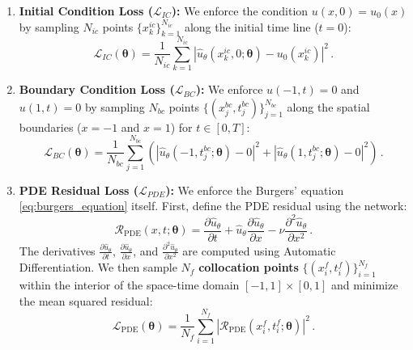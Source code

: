 \begin{enumerate}
    \item \textbf{Initial Condition Loss ($\mathcal{L}_{IC}$):} We enforce the condition $u(x, 0) = u_0(x)$ by sampling $N_{ic}$ points $\{x_k^{ic}\}_{k=1}^{N_{ic}}$ along the initial time line ($t=0$):
    \begin{equation}
    \mathcal{L}_{IC}(\boldsymbol{\theta}) = \frac{1}{N_{ic}} \sum_{k=1}^{N_{ic}} \left| \hat{u}_\theta(x_k^{ic}, 0; \boldsymbol{\theta}) - u_0(x_k^{ic}) \right|^2\,.
    \label{eq:loss_ic_burgers}
    \end{equation}

    \item \textbf{Boundary Condition Loss ($\mathcal{L}_{BC}$):} We enforce $u(-1, t) = 0$ and $u(1, t) = 0$ by sampling $N_{bc}$ points $\{(x_j^{bc}, t_j^{bc})\}_{j=1}^{N_{bc}}$ along the spatial boundaries ($x=-1$ and $x=1$) for $t \in [0, T]$:
    \begin{equation}
    \mathcal{L}_{BC}(\boldsymbol{\theta}) = \frac{1}{N_{bc}} \sum_{j=1}^{N_{bc}} \left( |\hat{u}_\theta(-1, t_j^{bc}; \boldsymbol{\theta}) - 0|^2 + |\hat{u}_\theta(1, t_j^{bc}; \boldsymbol{\theta}) - 0|^2 \right)\,.
    \label{eq:loss_bc_burgers}
    \end{equation}

    \item \textbf{PDE Residual Loss ($\mathcal{L}_{PDE}$):} We enforce the Burgers' equation \eqref{eq:burgers_equation} itself. First, define the PDE residual using the network:
    \begin{equation*}
    \mathcal{R}_{\text{PDE}}(x, t; \boldsymbol{\theta}) = \frac{\partial \hat{u}_\theta}{\partial t} + \hat{u}_\theta \frac{\partial \hat{u}_\theta}{\partial x} - \nu \frac{\partial^2 \hat{u}_\theta}{\partial x^2}\,.
    \end{equation*}
    The derivatives $\frac{\partial \hat{u}_\theta}{\partial t}$, $\frac{\partial \hat{u}_\theta}{\partial x}$, and $\frac{\partial^2 \hat{u}_\theta}{\partial x^2}$ are computed using Automatic Differentiation. We then sample $N_f$ \textbf{collocation points} $\{(x_i^f, t_i^f)\}_{i=1}^{N_f}$ within the interior of the space-time domain $[-1, 1] \times [0, 1]$ and minimize the mean squared residual:
    \begin{equation}
    \mathcal{L}_{\text{PDE}}(\boldsymbol{\theta}) = \frac{1}{N_{f}} \sum_{i=1}^{N_{f}} \left| \mathcal{R}_{\text{PDE}}(x_i^f, t_i^f; \boldsymbol{\theta}) \right|^2\,.
    \label{eq:loss_pde_burgers}
    \end{equation}
\end{enumerate}

